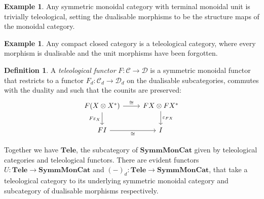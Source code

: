 \documentclass[11pt,a4paper]{article}
\theoremstyle{plain}
\theoremstyle{definition}
\newtheorem{definition}[theorem]{Definition}
\newtheorem{example}[theorem]{Example}
\newcommand{\C}{\mathscr{C}}
\newcommand{\D}{\mathscr{D}}
\newcommand{\SymmMonCat}{\mathbf{SymmMonCat}}
\newcommand{\Tele}{\mathbf{Tele}}
\newcommand{\todo}[1]{\textcolor{red}{\small #1}}
\begin{document}
\begin{example}
  Any symmetric monoidal category with terminal monoidal unit is trivially teleological, setting the dualisable morphisms to be the structure maps of the monoidal category.
\end{example}

\begin{example}
  Any compact closed category is a teleological category, where every morphism is dualisable and the unit morphisms have been forgotten.
\end{example}



\begin{definition}
  A \emph{teleological functor} $F : \C \to \D$ is a symmetric monoidal functor that restricts to a functor $F_d : \C_d \to \D_d$ on the dualisable subcategories, commutes with the duality and such that the counits are preserved:
  \[
   \begin{tikzcd}
    F(X \otimes X^*) \ar[r, "\cong"]  \ar[d, "F\varepsilon_X", swap] & FX \otimes FX^* \ar[d, "\varepsilon_{FX}"] \\
    FI \ar[r, "\cong", swap] & I
  \end{tikzcd}
  \]
\end{definition} 


Together we have $\Tele$, the subcategory of $\SymmMonCat$ given by teleological categories and teleological functors. There are evident functors $U : \Tele \to \SymmMonCat$ and ${(-)}_d : \Tele \to \SymmMonCat$, that take a teleological category to its underlying symmetric monoidal category and subcategory of dualisable morphisms respectively.
\end{document}
